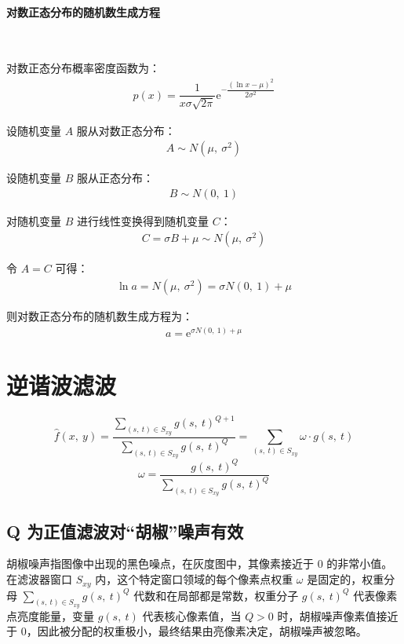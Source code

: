 \documentclass{article}
\newcommand{\e}{\mathrm{e}}
\begin{document}
\paragraph*{对数正态分布的随机数生成方程}~{}

对数正态分布概率密度函数为：
\begin{align*}
    p(x)=\dfrac{1}{\displaystyle x\sigma\sqrt{2\pi}}\e^{\displaystyle-\dfrac{\displaystyle(\ln x-\mu)^2}{2\sigma^2}}
\end{align*}

设随机变量 $A$ 服从对数正态分布：
\begin{align*}
    A\sim N(\mu,\ \sigma^2)
\end{align*}

设随机变量 $B$ 服从正态分布：
\begin{align*}
    B\sim N(0,\ 1)
\end{align*}

对随机变量 $B$ 进行线性变换得到随机变量 $C$：
\begin{align*}
    C=\sigma B+\mu\sim N(\mu,\ \sigma^2)
\end{align*}

令 $A=C$ 可得：
\begin{align*}
    \ln a = N(\mu,\ \sigma^2)=\sigma N(0,\ 1)+\mu
\end{align*}

则对数正态分布的随机数生成方程为：
\begin{align*}
    a=\e^{\displaystyle\sigma N(0,\ 1)+\mu}
\end{align*}



\section{逆谐波滤波}
\[ \widehat{f}(x,\ y)=\dfrac{\displaystyle\sum\limits_{(s,\ t)\in S_{xy}}g(s,\ t)^{Q+1}}{\displaystyle\sum\limits_{(s,\ t)\in S_{xy}}g(s,\ t)^{Q}}=\sum_{(s,\ t)\in S_{xy}}\omega\cdot g(s,\ t) \]
\[ \omega=\dfrac{\displaystyle g(s,\ t)^Q}{\displaystyle\sum\limits_{(s,\ t)\in S_{xy}}g(s,\ t)^Q} \]

\subsection{Q 为正值滤波对“胡椒”噪声有效}
胡椒噪声指图像中出现的黑色噪点，在灰度图中，其像素接近于 0 的非常小值。在滤波器窗口 $S_{xy}$ 内，这个特定窗口领域的每个像素点权重 $\omega$ 是固定的，权重分母 $\displaystyle\sum\limits_{(s,\ t)\in S_{xy}}g(s,\ t)^Q$ 代数和在局部都是常数，权重分子 $g(s,\ t)^Q$ 代表像素点亮度能量，变量 $g(s,\ t)$ 代表核心像素值，当 $Q>0$ 时，胡椒噪声像素值接近于 0，因此被分配的权重极小，最终结果由亮像素决定，胡椒噪声被忽略。
\end{document}
